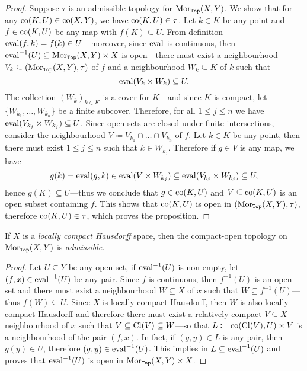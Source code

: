 \begin{proof}
Suppose \(\tau\) is an admissible topology for \(\operatorname{Mor}_{{\texttt{Top}}}(X, Y)\). We show
that for any \(\operatorname{co}(K, U) \in \operatorname{co}(X, Y)\), we have \(\operatorname{co}(K, U) \in \tau\). Let
\(k \in K\) be any point and \(f \in \operatorname{co}(K, U)\) be any map with
\(f(K) \subseteq U\). From definition \(\operatorname{eval}(f, k) = f(k) \in U\)---moreover,
since \(\operatorname{eval}\) is continuous, then
\(\operatorname{eval}^{-1}(U) \subseteq \operatorname{Mor}_{{\texttt{Top}}}(X, Y) \times X\) is open---there must
exist a neighbourhood \(V_k \subseteq (\operatorname{Mor}_{{\texttt{Top}}}(X, Y), \tau)\) of \(f\) and a
neighbourhood \(W_k \subseteq K\) of \(k\) such that
\[
\operatorname{eval}(V_k \times W_k) \subseteq U.
\]
The collection \((W_k)_{k \in K}\) is a cover for \(K\)---and since \(K\) is
compact, let \(\{W_{k_1}, \dots, W_{k_n}\}\) be a finite subcover. Therefore,
for all \(1 \leq j \leq n\) we have
\(\operatorname{eval}(V_{k_j} \times W_{k_j}) \subseteq U\). Since open sets are closed under
finite intersections, consider the neighbourhood
\(V \coloneq V_{k_1} \cap \dots \cap V_{k_n}\) of \(f\). Let
\(k \in K\) be any point, then there must exist \(1 \leq j \leq n\) such that
\(k \in W_{k_j}\). Therefore if \(g \in V\) is any map, we have
\[
g(k) = \operatorname{eval}(g, k) \in \operatorname{eval}(V \times W_{k_j}) \subseteq
\operatorname{eval}(V_{k_j} \times W_{k_j}) \subseteq U,
\]
hence \(g(K) \subseteq U\)---thus we conclude that \(g \in \operatorname{co}(K, U)\) and \(V
\subseteq \operatorname{co}(K, U)\) is an open subset containing \(f\). This shows that
\(\operatorname{co}(K, U)\) is open in \((\operatorname{Mor}_{{\texttt{Top}}}(X, Y), \tau)\), therefore \(\operatorname{co}(K, U)
\in \tau\), which proves the proposition.
\end{proof}

\begin{proposition}
\label{prop:cpct-open-is-admissible}
If \(X\) is a \emph{locally compact Hausdorff} space, then the compact-open
topology on \(\operatorname{Mor}_{{\texttt{Top}}}(X, Y)\) is \emph{admissible}.
\end{proposition}

\begin{proof}
Let \(U \subseteq Y\) be any open set, if \(\operatorname{eval}^{-1}(U)\) is non-empty, let
\((f, x) \in \operatorname{eval}^{-1}(U)\) be any pair. Since \(f\) is continuous, then
\(f^{-1}(U)\) is an open set and there must exist a neighbourhood
\(W \subseteq X\) of \(x\) such that \(W \subseteq f^{-1}(U)\)---thus
\(f(W) \subseteq U\). Since \(X\) is locally compact Hausdorff, then \(W\) is
also locally compact Hausdorff and therefore there must exist a relatively
compact \(V \subseteq X\) neighbourhood of \(x\) such that
\(V \subseteq \operatorname{Cl}(V) \subseteq W\)---so that
\(L \coloneq \operatorname{co}(\operatorname{Cl}(V), U) \times V\) is a neighbourhood of the pair
\((f, x)\). In fact, if \((g, y) \in L\) is any pair, then \(g(y) \in U\),
therefore \((g, y) \in \operatorname{eval}^{-1}(U)\). This implies in
\(L \subseteq \operatorname{eval}^{-1}(U)\) and proves that \(\operatorname{eval}^{-1}(U)\) is open in
\(\operatorname{Mor}_{{\texttt{Top}}}(X, Y) \times X\).
\end{proof}

